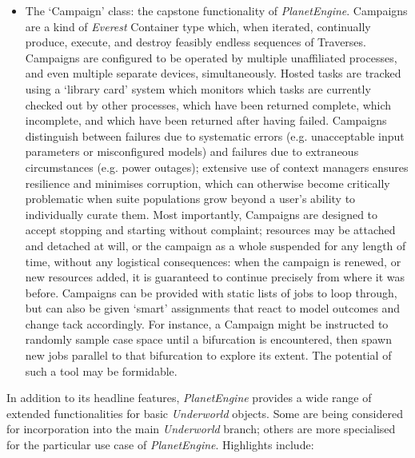 \documentclass[a4paper,11pt,oneside]{book}
\begin{document}
\begin{itemize}
\item The `Campaign' class: the capstone functionality of \textit{PlanetEngine}. Campaigns are a kind of \textit{Everest} Container type which, when iterated, continually produce, execute, and destroy feasibly endless sequences of Traverses. Campaigns are configured to be operated by multiple unaffiliated processes, and even multiple separate devices, simultaneously. Hosted tasks are tracked using a `library card' system which monitors which tasks are currently checked out by other processes, which have been returned complete, which incomplete, and which have been returned after having failed. Campaigns distinguish between failures due to systematic errors (e.g. unacceptable input parameters or misconfigured models) and failures due to extraneous circumstances (e.g. power outages); extensive use of context managers ensures resilience and minimises corruption, which can otherwise become critically problematic when suite populations grow beyond a user's ability to individually curate them. Most importantly, Campaigns are designed to accept stopping and starting without complaint; resources may be attached and detached at will, or the campaign as a whole suspended for any length of time, without any logistical consequences: when the campaign is renewed, or new resources added, it is guaranteed to continue precisely from where it was before. Campaigns can be provided with static lists of jobs to loop through, but can also be given `smart' assignments that react to model outcomes and change tack accordingly. For instance, a Campaign might be instructed to randomly sample case space until a bifurcation is encountered, then spawn new jobs parallel to that bifurcation to explore its extent. The potential of such a tool may be formidable.
\end{itemize}

In addition to its headline features, \textit{PlanetEngine} provides a wide range of extended functionalities for basic \textit{Underworld} objects. Some are being considered for incorporation into the main \textit{Underworld} branch; others are more specialised for the particular use case of \textit{PlanetEngine}. Highlights include:
\end{document}
